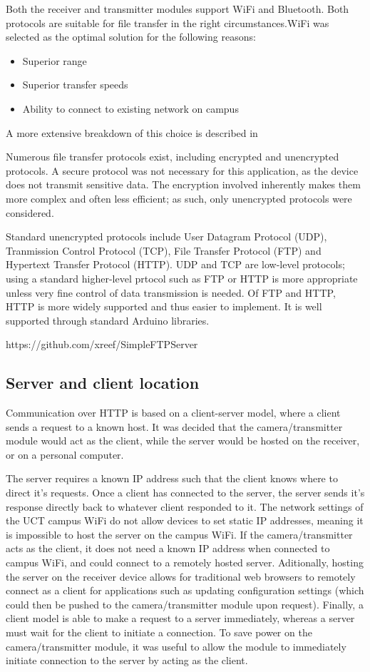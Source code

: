 Both the receiver and transmitter modules support WiFi and Bluetooth. Both protocols are suitable for file transfer in the right circumstances.WiFi was selected as the optimal solution for the following reasons:
\begin{itemize}
    \item Superior range
    \item Superior transfer speeds
    \item Ability to connect to existing network on campus
\end{itemize}

A more extensive breakdown of this choice is described in %

Numerous file transfer protocols exist, including encrypted and unencrypted protocols. A secure protocol was not necessary for this application, as the device does not transmit sensitive data. The encryption involved inherently makes them more complex and often less efficient; as such, only unencrypted protocols were considered.

Standard unencrypted protocols include User Datagram Protocol (UDP), Tranmission Control Protocol (TCP), File Transfer Protocol (FTP) and Hypertext Transfer Protocol (HTTP). UDP and TCP are low-level protocols; using a standard higher-level prtocol such as FTP or HTTP is more appropriate unless very fine control of data transmission is needed. Of FTP and HTTP, HTTP is more widely supported and thus easier to implement. It is well supported through standard Arduino libraries.

https://github.com/xreef/SimpleFTPServer

\subsection{Server and client location}

Communication over HTTP is based on a client-server model, where a client sends a request to a known host. It was decided that the camera/transmitter module would act as the client, while the server would be hosted on the receiver, or on a personal computer. 

The server requires a known IP address such that the client knows where to direct it's requests. Once a client has connected to the server, the server sends it's response directly back to whatever client responded to it. The network settings of the UCT campus WiFi do not allow devices to set static IP addresses, meaning it is impossible to host the server on the campus WiFi. If the camera/transmitter acts as the client, it does not need a known IP address when connected to campus WiFi, and could connect to a remotely hosted server. Aditionally, hosting the server on the receiver device allows for traditional web browsers to remotely connect as a client for applications such as updating configuration settings (which could then be pushed to the camera/transmitter module upon request). Finally, a client model is able to make a request to a server immediately, whereas a server must wait for the client to initiate a connection. To save power on the camera/transmitter module, it was useful to allow the module to immediately initiate connection to the server by acting as the client.

